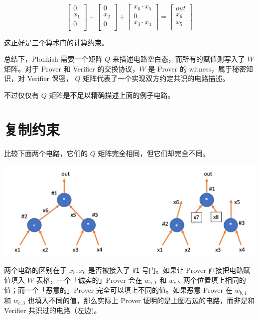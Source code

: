 \[
\left[
\begin{array}{c}
0 \\
x_1 \\
0\\
\end{array}
\right]
+
\left[
\begin{array}{c}
0 \\
x_2 \\
0\\
\end{array}
\right]
+
\left[
\begin{array}{c}
x_6\cdot x_5 \\
0 \\
x_3\cdot x_4\\
\end{array}
\right]=\left[
\begin{array}{c}
out \\
x_6 \\
x_5\\
\end{array}
\right]
\]

这正好是三个算术门的计算约束。

总结下，Plonkish 需要一个矩阵 \(Q\)
来描述电路空白态，而所有的赋值则写入了 \(W\) 矩阵。对于 Prover 和
Verifier 的交换协议，\(W\) 是 Prover 的 witness，属于秘密知识，对
Verifier 保密， \(Q\) 矩阵代表了一个实现双方约定共识的电路描述。

不过仅仅有 \(Q\) 矩阵是不足以精确描述上面的例子电路。

\hypertarget{ux590dux5236ux7ea6ux675f}{%
\section{复制约束}\label{ux590dux5236ux7ea6ux675f}}

比较下面两个电路，它们的 \(Q\) 矩阵完全相同，但它们却完全不同。

\includegraphics{img/img20230414205219.png}

两个电路的区别在于 \(x_5, x_6\) 是否被接入了 \texttt{\#1} 号门。如果让
Prover 直接把电路赋值填入 \(W\) 表格，一个「诚实的」Prover 会在
\(w_{a,1}\) 和 \(w_{c,2}\) 两个位置填上相同的值；而一个「恶意的」Prover
完全可以填上不同的值。如果恶意 Prover 在 \(w_{b,1}\) 和 \(w_{c,3}\)
也填入不同的值，那么实际上 Prover 证明的是上图右边的电路，而非是和
Verifier 共识过的电路（左边)。

